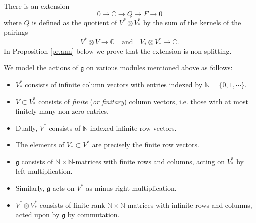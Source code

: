 \documentclass[11pt]{article}
\theoremstyle{plain}
\theoremstyle{nonumberplain}
\theoremstyle{plain}
\numberwithin{equation}{section}
\theoremstyle{nonumberplain}
\newcommand\bC{{\mathbb C}}
\newcommand\bN{{\mathbb N}}
\newcommand\bT{{\mathbb T}}
\newcommand\fg{{\mathfrak g}}
\newcommand\1{{\bf 1}}
\begin{document}
There is an extension
\begin{equation}\label{eq:exatseqQ}
  0\to \bC\to Q\to F\to 0
\end{equation}
where $Q$ is defined as the quotient of $V^*\otimes V_*^*$ by the sum of the kernels of the pairings
\begin{equation*}
  V^*\otimes V\to \bC\quad \text{and}\quad V_*\otimes V_*^*\to \bC.
\end{equation*}
In Proposition \ref{pr.ann} below we prove that the extension  is non-splitting.


We model the actions of $\fg$ on various modules mentioned above as follows:

\begin{itemize}
\item[$-$] $V_*^*$ consists of infinite column vectors with entries indexed by $\bN=\{0,1,\cdots\}$.
\item[$-$] $V\subset V^*_*$ consists of {\it finite} ({\it or finitary}) column vectors, i.e. those with at most finitely many non-zero entries.
\item[$-$] Dually, $V^*$ consists of $\bN$-indexed infinite row vectors.
\item[$-$] The elements of $V_*\subset V^*$ are precisely the finite row vectors. 
\item[$-$] $\fg$ consists of $\bN\times \bN$-matrices with finite rows and columns, acting on $V_*^*$ by left multiplication.
\item[$-$] Similarly, $\fg$ acts on $V^*$ as minus right multiplication. 
\item[$-$] $V^*\otimes V^*_*$ consists of finite-rank $\bN\times \bN$ matrices with infinite rows and columns, acted upon by $\fg$ by commutation.
\end{itemize}
\end{document}
